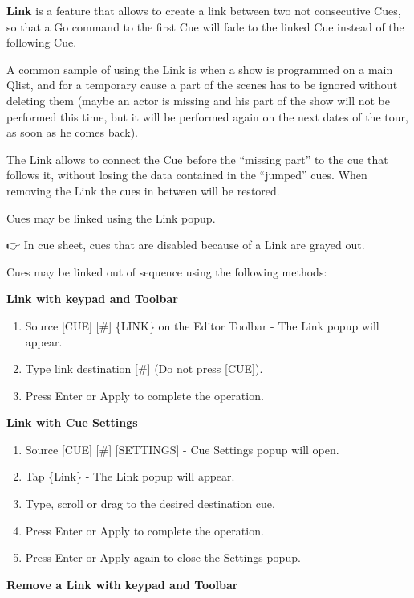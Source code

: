 \documentclass[
]{article}
\begin{document}
\textbf{Link} is a feature that allows to create a link between two not consecutive Cues, so that a Go command to the first Cue will fade to the linked Cue instead of the following Cue.

A common sample of using the Link is when a show is programmed on a main Qlist, and for a temporary cause a part of the scenes has to be ignored without deleting them (maybe an actor is missing and his part of the show will not be performed this time, but it will be performed again on the next dates of the tour, as soon as he comes back).

The Link allows to connect the Cue before the ``missing part'' to the cue that follows it, without losing the data contained in the ``jumped'' cues. When removing the Link the cues in between will be restored.

Cues may be linked using the Link popup.

👉 In cue sheet, cues that are disabled because of a Link are grayed out.

Cues may be linked out of sequence using the following methods:

\textbf{Link with keypad and Toolbar}

\begin{enumerate}
\def\labelenumi{\arabic{enumi}.}
\item
  Source {[}CUE{]} {[}\#{]} \{LINK\} on the Editor Toolbar - The Link popup will appear.
\item
  Type link destination {[}\#{]} (Do not press {[}CUE{]}).
\item
  Press Enter or Apply to complete the operation.
\end{enumerate}

\textbf{Link with Cue Settings}

\begin{enumerate}
\def\labelenumi{\arabic{enumi}.}
\item
  Source {[}CUE{]} {[}\#{]} {[}SETTINGS{]} - Cue Settings popup will open.
\item
  Tap \{Link\} - The Link popup will appear.
\item
  Type, scroll or drag to the desired destination cue.
\item
  Press Enter or Apply to complete the operation.
\item
  Press Enter or Apply again to close the Settings popup.
\end{enumerate}

\textbf{Remove a Link with keypad and Toolbar}
\end{document}
